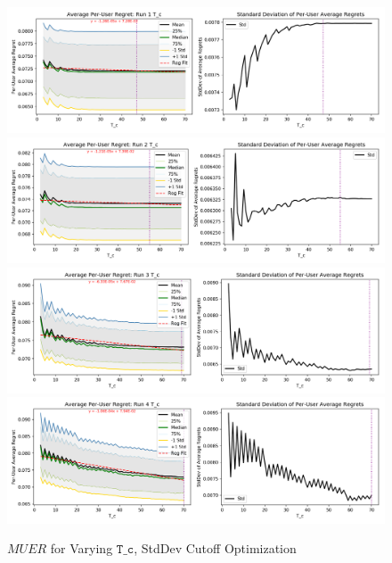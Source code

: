 	\begin{figure}[H]
	\includegraphics[width=1.1\textwidth,center]{figures/opt_param/opt_param_std_11100_T_c1.png}%
	\newline
	\includegraphics[width=1.1\textwidth,center]{figures/opt_param/opt_param_std_11100_T_c2.png}%
	\newline
	\includegraphics[width=1.1\textwidth,center]{figures/opt_param/opt_param_std_11100_T_c3.png}%
	\newline
	\includegraphics[width=1.1\textwidth,center]{figures/opt_param/opt_param_std_11100_T_c4.png}%
	\caption{$MUER$ for Varying $\mathtt{T\_c}$, StdDev Cutoff Optimization}
	\end{figure}

